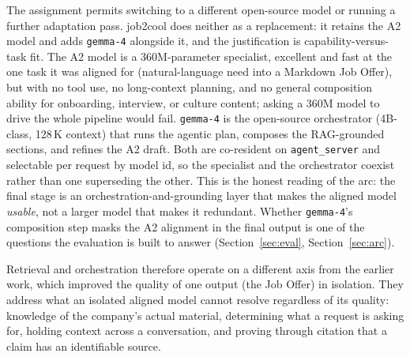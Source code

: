 The assignment permits switching to a different open-source model or running a further
adaptation pass. job2cool does neither as a replacement: it retains the A2 model and adds
\verb|gemma-4| alongside it, and the justification is capability-versus-task fit. The A2
model is a 360M-parameter specialist, excellent and fast at the one task it was aligned
for (natural-language need into a Markdown Job Offer), but with no tool use, no
long-context planning, and no general composition ability for onboarding, interview, or
culture content; asking a 360M model to drive the whole pipeline would fail. \verb|gemma-4|
is the open-source orchestrator (4B-class, 128\,K context) that runs the agentic plan,
composes the RAG-grounded sections, and refines the A2 draft. Both are co-resident on
\verb|agent_server| and selectable per request by model id, so the specialist and the
orchestrator coexist rather than one superseding the other. This is the honest reading of
the arc: the final stage is an orchestration-and-grounding layer that makes the aligned
model \emph{usable}, not a larger model that makes it redundant. Whether \verb|gemma-4|'s
composition step masks the A2 alignment in the final output is one of the questions the
evaluation is built to answer (Section~\ref{sec:eval}, Section~\ref{sec:arc}).

Retrieval and orchestration therefore operate on a different axis from the earlier work,
which improved the quality of one output (the Job Offer) in isolation. They address what
an isolated aligned model cannot resolve regardless of its quality: knowledge of the
company's actual material, determining what a request is asking for, holding context
across a conversation, and proving through citation that a claim has an identifiable
source.
